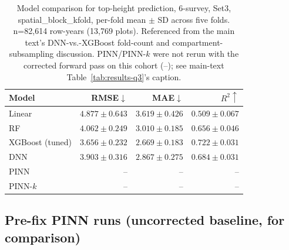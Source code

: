 \begin{table}[!htbp]
\centering
\scriptsize
\setlength{\tabcolsep}{4pt}
\renewcommand{\arraystretch}{1.2}
\begin{tabular}{lrrr}
\toprule
Model & RMSE${\downarrow}$ & MAE${\downarrow}$ & $R^2{\uparrow}$ \\
\midrule
Linear & $4.877{\pm}0.643$ & $3.619{\pm}0.426$ & $0.509{\pm}0.067$ \\
RF & $4.062{\pm}0.249$ & $3.010{\pm}0.185$ & $0.656{\pm}0.046$ \\
XGBoost (tuned) & $\mathbf{3.656{\pm}0.232}$ & $\mathbf{2.669{\pm}0.183}$ & $\mathbf{0.722{\pm}0.031}$ \\
DNN & $3.903{\pm}0.316$ & $2.867{\pm}0.275$ & $0.684{\pm}0.031$ \\
PINN & -- & -- & -- \\
PINN-$k$ & -- & -- & -- \\
\bottomrule
\end{tabular}
\caption{\small{Model comparison for top-height prediction, 6-survey, Set3,
spatial\_block\_kfold, per-fold mean $\pm$ SD across five folds. n=82{,}614 row-years
(13{,}769 plots). Referenced from the main text's DNN-vs.-XGBoost fold-count and
compartment-subsampling discussion. PINN/PINN-$k$ were not rerun with the corrected
forward pass on this cohort (--); see main-text Table~\ref{tab:results-q3}'s caption.}}
\label{tab:results-q3-6survey}
\end{table}

\subsection{Pre-fix PINN runs (uncorrected baseline, for comparison)}
\label{app:results-q3-prefix-pinn}
